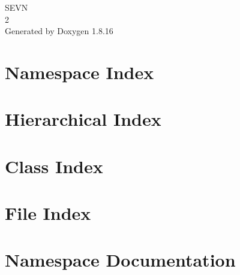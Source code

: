 \let\mypdfximage\pdfximage\def\pdfximage{\immediate\mypdfximage}\documentclass[twoside]{book}
\newcommand{\+}{\discretionary{\mbox{\scriptsize$\hookleftarrow$}}{}{}}
\newcommand{\clearemptydoublepage}{%
  \newpage{\pagestyle{empty}\cleardoublepage}%
}
\begin{document}
\hypersetup{pageanchor=false,
             bookmarksnumbered=true,
             pdfencoding=unicode
            }
\begin{titlepage}
\vspace*{7cm}
\begin{center}%
{\Large S\+E\+VN \\[1ex]\large 2 }\\
\vspace*{1cm}
{\large Generated by Doxygen 1.8.16}\\
\end{center}
\end{titlepage}
\clearemptydoublepage
{}
\tableofcontents
\clearemptydoublepage
{}
\hypersetup{pageanchor=true}

\chapter{Namespace Index}

\chapter{Hierarchical Index}

\chapter{Class Index}

\chapter{File Index}

\chapter{Namespace Documentation}





\end{document}
